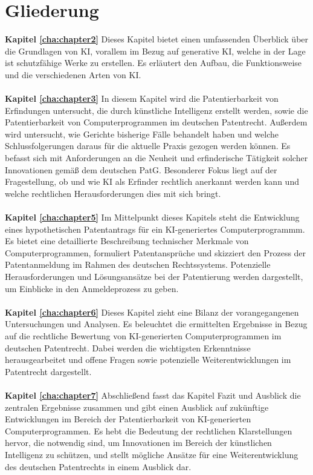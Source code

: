 \section{Gliederung\label{sec:outline}}


\textbf{Kapitel \ref{cha:chapter2}} 
Dieses Kapitel bietet einen umfassenden Überblick über die Grundlagen
von KI, vorallem im Bezug auf generative KI, welche in der
Lage ist schutzfähige Werke zu erstellen.
Es erläutert den Aufbau, 
die Funktionsweise und die verschiedenen Arten von KI.
\\
\\
\textbf{Kapitel \ref{cha:chapter3}} 
In diesem Kapitel wird die Patentierbarkeit von Erfindungen untersucht,
die durch künstliche Intelligenz erstellt werden, 
sowie die Patentierbarkeit von Computerprogrammen im deutschen Patentrecht. 
Außerdem wird untersucht, wie Gerichte bisherige Fälle behandelt haben 
und welche Schlussfolgerungen daraus für die aktuelle Praxis gezogen werden können. 
Es befasst sich mit Anforderungen an die Neuheit 
und erfinderische Tätigkeit solcher Innovationen gemäß dem deutschen PatG. 
Besonderer Fokus liegt auf der Fragestellung, 
ob und wie KI als Erfinder rechtlich anerkannt werden kann 
und welche rechtlichen Herausforderungen dies mit sich bringt.
\\
\\
\textbf{Kapitel \ref{cha:chapter5}} 
Im Mittelpunkt dieses Kapitels steht die Entwicklung eines hypothetischen Patentantrags 
für ein KI-generiertes Computerprogrammm. 
Es bietet eine detaillierte Beschreibung technischer Merkmale von Computerprogrammen, 
formuliert Patentansprüche und 
skizziert den Prozess der Patentanmeldung im Rahmen des deutschen Rechtssystems. 
Potenzielle Herausforderungen und Lösungsansätze bei der Patentierung werden dargestellt, 
um Einblicke in den Anmeldeprozess zu geben.
\\
\\
\textbf{Kapitel \ref{cha:chapter6}} 
Dieses Kapitel zieht eine Bilanz der vorangegangenen Untersuchungen und Analysen. 
Es beleuchtet die ermittelten Ergebnisse in Bezug auf die rechtliche Bewertung 
von KI-generierten Computerprogrammen im deutschen Patentrecht. 
Dabei werden die wichtigsten Erkenntnisse herausgearbeitet 
und offene Fragen sowie potenzielle 
Weiterentwicklungen im Patentrecht dargestellt.
\\
\\
\textbf{Kapitel \ref{cha:chapter7}} 
Abschließend fasst das Kapitel Fazit und Ausblick die zentralen Ergebnisse zusammen 
und gibt einen Ausblick auf zukünftige Entwicklungen im Bereich der Patentierbarkeit 
von KI-generierten Computerprogrammen. 
Es hebt die Bedeutung der rechtlichen Klarstellungen hervor, 
die notwendig sind, um Innovationen im Bereich der künstlichen Intelligenz zu schützen, 
und stellt mögliche Ansätze für eine Weiterentwicklung des deutschen Patentrechts 
in einem Ausblick dar.